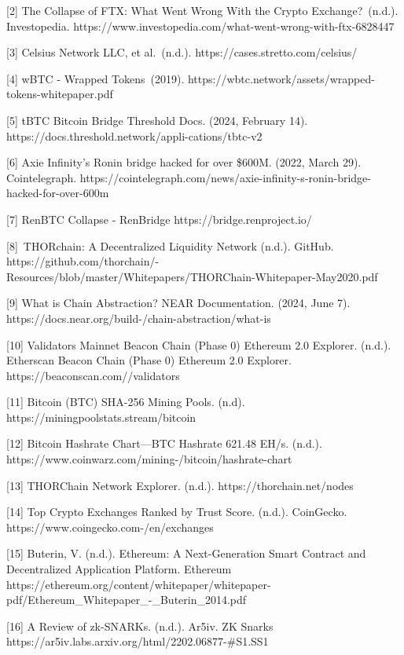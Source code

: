 \documentclass[
]{article}
\begin{document}
{{{{{[}2{]} }{The Collapse of FTX: What Went Wrong With the Crypto
Exchange?}{~(n.d.). Investopedia. https://www.investopedia.com/what-went-wrong-with-ftx-6828447}}

{{[}3{]} }{Celsius Network LLC, et al.}{~(n.d.). https://cases.stretto.com/celsius/}

{{[}4{]} }{wBTC - Wrapped Tokens}{~(2019). https://wbtc.network/assets/wrapped-tokens-whitepaper.pdf}

{{[}5{]} }{tBTC Bitcoin Bridge \textbar{} Threshold Docs}{. (2024,
February 14). https://docs.threshold.network/appli-}{cations/tbtc-v2}

{{[}6{]} }{Axie Infinity's Ronin bridge hacked for over \$600M}{. (2022,
March 29). Cointelegraph. https://cointelegraph.com/news/axie-infinity-s-ronin-bridge-hacked-for-over-600m}

{{[}7{]} }{RenBTC Collapse -
RenBridge https://bridge.renproject.io/}

{{[}8{]}}{~THORchain: A Decentralized Liquidity Network }{(n.d.).
GitHub. https://github.com/thorchain/-}{Resources/blob/master/Whitepapers/THORChain-Whitepaper-May2020.pdf}

{{[}9{]} }{What is Chain Abstraction? \textbar{} NEAR Documentation}{.
(2024, June
7). https://docs.near.org/build-}{/chain-abstraction/what-is}

{{[}10{]} }{Validators \textbar{} Mainnet Beacon Chain (Phase 0)
Ethereum 2.0 Explorer}{. (n.d.). Etherscan Beacon Chain (Phase 0) Ethereum 2.0 Explorer. https://beaconscan.com//validators}

{{[}11{]} }{Bitcoin (BTC) SHA-256 \textbar{} Mining Pools}{. (n.d). https://miningpoolstats.stream/bitcoin}

{{[}12{]} }{Bitcoin Hashrate Chart---BTC Hashrate 621.48 EH/s}{.
(n.d.). https://www.coinwarz.com/mining-}{/bitcoin/hashrate-chart}

{{[}13{]} }{THORChain Network Explorer}{. (n.d.). https://thorchain.net/nodes}

{{[}14{]} }{Top Crypto Exchanges Ranked by Trust Score}{. (n.d.).
CoinGecko. https://www.coingecko.com-}{/en/exchanges}

{{[}15{]} Buterin, V. (n.d.). }{Ethereum: A Next-Generation Smart
Contract and Decentralized Application Platform. Ethereum https://ethereum.org/content/whitepaper/whitepaper-pdf/Ethereum\_Whitepaper\_-\_Buterin\_2014.pdf}

{{[}16{]} }{A Review of zk-SNARKs}{. (n.d.). Ar5iv. ZK Snarks
https://ar5iv.labs.arxiv.org/html/2202.06877-}{\#S1.SS1}

}}
\end{document}
